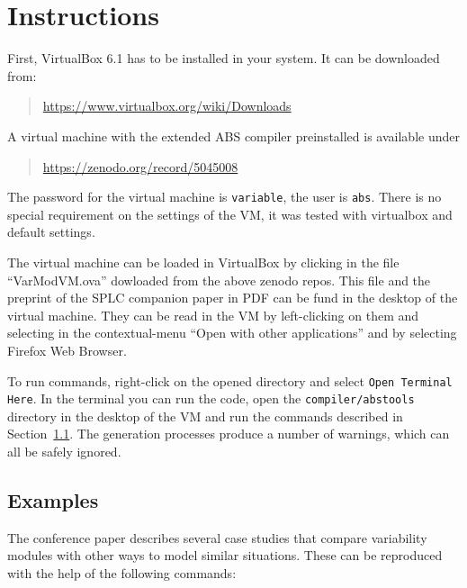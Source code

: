 \documentclass[runningheads]{llncs}
\begin{document}
\section{Instructions}

First, VirtualBox 6.1 has to be installed in your system. It can be downloaded from:
\begin{quote}
  \url{https://www.virtualbox.org/wiki/Downloads}
\end{quote}


A virtual machine with the extended ABS compiler preinstalled is available under 
\begin{quote}
\url{https://zenodo.org/record/5045008}
\end{quote}


The password for the virtual machine is \texttt{variable}, the user is \texttt{abs}. There is no special requirement on the settings of the VM, it was tested with virtualbox and default settings.

The virtual machine can be loaded in VirtualBox by clicking in the file ``VarModVM.ova'' dowloaded  from the above zenodo repos.
This file and the preprint of the SPLC companion paper in PDF can be fund in the desktop of the virtual machine.
They can be read in the VM by left-clicking on them and selecting in the contextual-menu ``Open with other applications'' and  by selecting Firefox Web Browser. 

To run commands, right-click on the opened directory and select \texttt{Open Terminal Here}.
In the terminal you can run the code, open the \texttt{compiler/abstools} directory in the desktop of the VM and run the commands described in Section~\ref{sec:examples}.
The generation processes produce a number of warnings, which can all be safely ignored.


\subsection{Examples}\label{sec:examples}


The conference paper \cite{new} describes several case studies that compare variability modules with other ways to model similar situations.
These can be reproduced with the help of the following commands:
\end{document}
